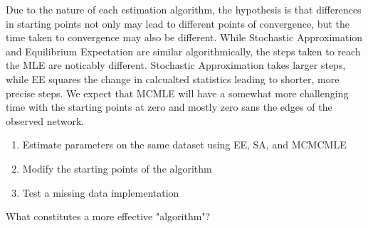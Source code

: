 Due to the nature of each estimation algorithm, the hypothesis is that differences in starting points not only may lead to different points of convergence, but the time taken to convergence may also be different. While Stochastic Approximation and Equilibrium Expectation are similar algorithmically, the steps taken to reach the MLE are noticably different. Stochastic Approximation takes larger steps, while EE squares the change in calcualted statistics leading to shorter, more precise steps. We expect that MCMLE will have a somewhat more challenging time with the starting points at zero and mostly zero sans the edges of the observed network.

\begin{enumerate}
\item Estimate parameters on the same dataset using EE, SA, and MCMCMLE
\item Modify the starting points of the algorithm
\item Test a missing data implementation
\end{enumerate}

What constitutes a more effective "algorithm"?

